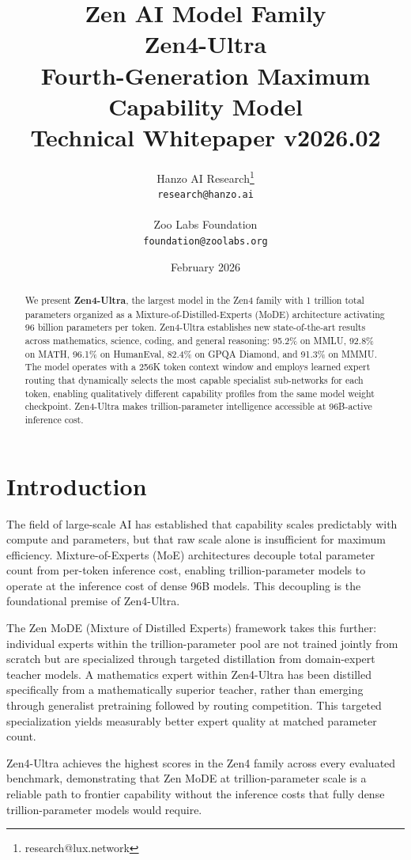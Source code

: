 \documentclass[11pt,a4paper]{article}
\title{
    \vspace{-2cm}
    \Large \textbf{Zen AI Model Family} \\
    \vspace{0.5cm}
    \Huge \textbf{Zen4-Ultra} \\
    \vspace{0.3cm}
    \large Fourth-Generation Maximum Capability Model \\
    \vspace{0.5cm}
    \normalsize Technical Whitepaper v2026.02
}
\author{
    Hanzo AI Research\thanks{research@lux.network} \\
    \texttt{research@hanzo.ai} \\
    \\
    Zoo Labs Foundation \\
    \texttt{foundation@zoolabs.org}
}
\date{February 2026}
\begin{document}
\maketitle

\begin{abstract}
We present \textbf{Zen4-Ultra}, the largest model in the Zen4 family with 1 trillion total
parameters organized as a Mixture-of-Distilled-Experts (MoDE) architecture activating
96 billion parameters per token. Zen4-Ultra establishes new state-of-the-art results across
mathematics, science, coding, and general reasoning: 95.2\% on MMLU, 92.8\% on MATH,
96.1\% on HumanEval, 82.4\% on GPQA Diamond, and 91.3\% on MMMU. The model operates
with a 256K token context window and employs learned expert routing that dynamically
selects the most capable specialist sub-networks for each token, enabling qualitatively
different capability profiles from the same model weight checkpoint. Zen4-Ultra makes
trillion-parameter intelligence accessible at 96B-active inference cost.
\end{abstract}

\tableofcontents
\newpage

\section{Introduction}

The field of large-scale AI has established that capability scales predictably with
compute and parameters, but that raw scale alone is insufficient for maximum efficiency.
Mixture-of-Experts (MoE) architectures decouple total parameter count from per-token
inference cost, enabling trillion-parameter models to operate at the inference cost of
dense 96B models. This decoupling is the foundational premise of Zen4-Ultra.

The Zen MoDE (Mixture of Distilled Experts) framework takes this further: individual
experts within the trillion-parameter pool are not trained jointly from scratch but are
specialized through targeted distillation from domain-expert teacher models. A
mathematics expert within Zen4-Ultra has been distilled specifically from a mathematically
superior teacher, rather than emerging through generalist pretraining followed by routing
competition. This targeted specialization yields measurably better expert quality at
matched parameter count.

Zen4-Ultra achieves the highest scores in the Zen4 family across every evaluated benchmark,
demonstrating that Zen MoDE at trillion-parameter scale is a reliable path to frontier
capability without the inference costs that fully dense trillion-parameter models would
require.
\end{document}
